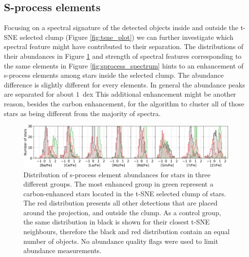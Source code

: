 \subsection{S-process elements}
\label{sec:sprocess}
Focusing on a spectral signature of the detected objects inside and outside the t-SNE selected clump (Figure \ref{fig:tsne_plot}) we can further investigate which spectral feature might have contributed to their separation. The distributions of their abundances in Figure \ref{fig:sprocess_hist} and strength of spectral features corresponding to the same elements in Figure \ref{fig:sprocess_spectrum} hints to an enhancement of s-process elements among stars inside the selected clump. The abundance difference is slightly  different for every elements. In general the abundance peaks are separated for about $1$~dex This additional enhancement might be another reason, besides the carbon enhancement, for the algorithm to cluster all of those stars as being different from the majority of spectra.

\begin{figure}
	\centering
	\includegraphics[width=\textwidth]{sprocess_hist.png}
	\caption{Distribution of s-process element abundances for stars in three different groups. The most enhanced group in green represent a carbon-enhanced stars located in the t-SNE selected clump of stars. The red distribution presents all other detections that are placed around the projection, and outside the clump. As a control group, the same distribution in black is shown for their closest t-SNE neighbours, therefore the black and red distribution contain an equal number of objects. No abundance quality flags were used to limit abundance measurements.}
	\label{fig:sprocess_hist}
\end{figure}

